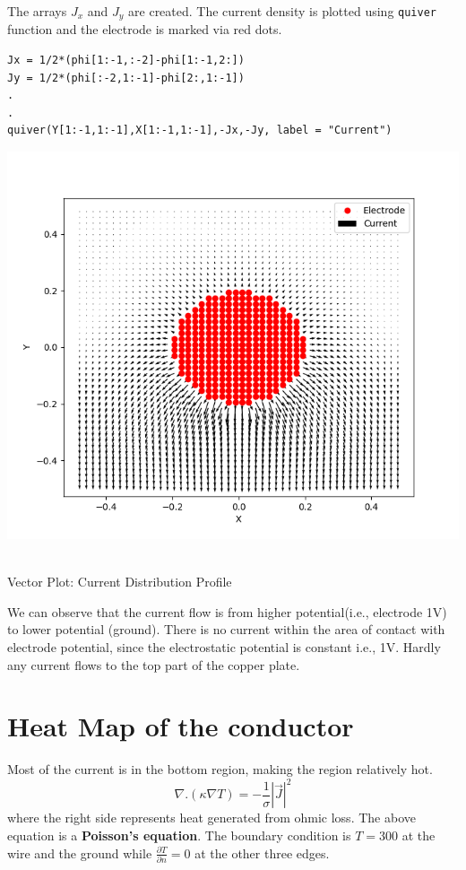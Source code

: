 \documentclass[12pt, a4paper]{report}
\begin{document}
The arrays $J_x$ and $J_y$ are created. The current density is plotted using \texttt{quiver} function and the electrode is marked via red dots.
\begin{verbatim}
Jx = 1/2*(phi[1:-1,:-2]-phi[1:-1,2:])
Jy = 1/2*(phi[:-2,1:-1]-phi[2:,1:-1])
.
.
quiver(Y[1:-1,1:-1],X[1:-1,1:-1],-Jx,-Jy, label = "Current")
\end{verbatim}
\begin{center}
	\includegraphics[scale=0.65]{Figure10} 
	\caption{\\Vector Plot: Current Distribution Profile}
	\label{fig:rawdata}
\end{center}
We can observe that the current flow is from higher potential(i.e., electrode 1V) to lower potential (ground). There is no current within the area of contact with electrode potential, since the electrostatic potential is constant i.e., 1V. Hardly any current flows to the top part of the copper plate.

\section*{Heat Map of the conductor}
Most of the current is in the bottom region, making the region relatively hot.
\begin{equation*}
\nabla.(\kappa\nabla T) = -\frac{1}{\sigma}|\overrightarrow{J}|^2
\end{equation*}
where the right side represents heat generated from ohmic loss. The above equation is a \textbf{Poisson's equation}. The boundary condition is $T=300$ at the wire and the ground while $\frac{\partial T}{\partial n} = 0$ at the other three edges.
\end{document}
